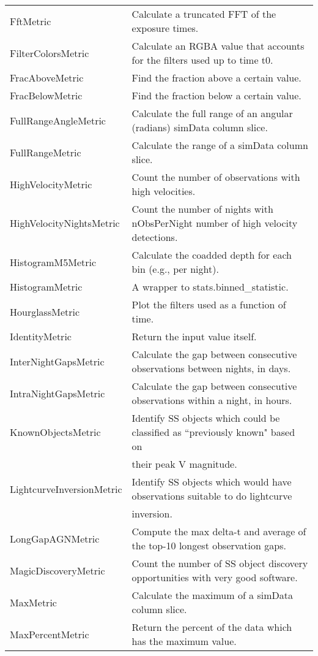 \begin{table}[!t]
\begin{tabular}{ll}
 FftMetric &  Calculate a truncated FFT of the exposure times. \\
 FilterColorsMetric &  Calculate an RGBA value that accounts for the filters used up to time t0. \\
 FracAboveMetric &  Find the fraction above a certain value. \\
 FracBelowMetric &  Find the fraction below a certain value. \\
 FullRangeAngleMetric &  Calculate the full range of an angular (radians) simData column slice. \\
 FullRangeMetric &  Calculate the range of a simData column slice. \\
 HighVelocityMetric &  Count the number of observations with high velocities. \\
 HighVelocityNightsMetric &  Count the number of nights with nObsPerNight number of high velocity detections. \\
 HistogramM5Metric &  Calculate the coadded depth for each bin (e.g., per night). \\
 HistogramMetric &  A wrapper to stats.binned\_statistic. \\
 HourglassMetric &  Plot the filters used as a function of time. \\
 IdentityMetric &  Return the input value itself. \\
 InterNightGapsMetric &  Calculate the gap between consecutive observations between nights, in days. \\
 IntraNightGapsMetric &  Calculate the gap between consecutive observations within a night, in hours. \\
 KnownObjectsMetric &  Identify SS objects which could be classified as ``previously known" based on \\
  &  their peak V magnitude. \\
 LightcurveInversionMetric &  Identify SS objects which would have observations suitable to do lightcurve \\
  &  inversion. \\
 LongGapAGNMetric &  Compute the max delta-t and average of the top-10 longest observation gaps. \\
 MagicDiscoveryMetric &  Count the number of SS object discovery opportunities with very good software. \\
 MaxMetric &  Calculate the maximum of a simData column slice. \\
 MaxPercentMetric &  Return the percent of the data which has the maximum value. \\

\end{tabular}
\end{table}
